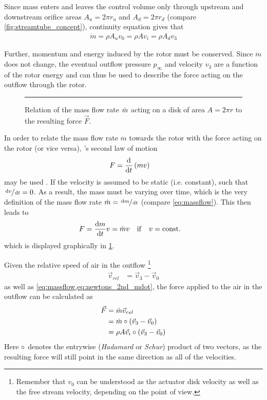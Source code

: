 Since mass enters and leaves the control volume only through upstream and downstream orifice areas $A_u = 2 \pi r_u$ and $A_d = 2 \pi r_d$ (compare \cref{fig:streamtube_concept}), continuity equation gives that 
%
\begin{align}
\dot{m} = \rho A_u v_0 = \rho A v_i = \rho A_d v_3 \label{eq:massflow_continuity}
\end{align}

Further, momentum and energy induced by the rotor must be conserved. 
Since $\dot{m}$ does not change, the eventual outflow pressure $p_\infty$ and velocity $v_3$ are a function of the rotor energy and can thus be used
to describe the force acting on the outflow through the rotor.

\begin{figure}
	\centering
	

	\rule{35em}{0.5pt}
	\caption[Mass flow rate and force]
			{Relation of the mass flow rate $\dot{m}$ acting on a disk of area $A = 2\pi r$ to the resulting force $\vec{F}$.}
	\label{fig:mass_flow_force}
\end{figure}

In order to relate the mass flow rate $\dot{m}$ towards the rotor with the force acting on the rotor (or vice versa), 's second law of motion
%
\begin{align}
F &= \frac{\mathop{}\!\mathrm{d}}{\mathop{}\!\mathrm{d} t} \left( m v \right) \label{eq:newtons_2nd}
\end{align}
%
may be used \cite{book:siekmann2008}.
If the velocity is assumed to be static (i.e. constant), such that $\sfrac{\mathop{}\!\mathrm{d} v}{\mathop{}\!\mathrm{d} t} = 0$. 
As a result, the mass must be varying over time, which is the very definition of the mass flow rate $\dot{m} = \sfrac{\mathop{}\!\mathrm{d} m}{\mathop{}\!\mathrm{d} t}$ (compare \cref{eq:massflow}). 
This then leads to
%
\begin{align}
F &= \frac{\mathop{}\!\mathrm{d} m}{\mathop{}\!\mathrm{d} t} v = \dot{m} v \quad \mathrm{if} \quad v = \mathrm{const.} \label{eq:newtons_2nd_mdot}
\end{align}
%
which is displayed graphically in \cref{fig:mass_flow_force}.

Given the relative speed of air in the outflow%
\footnote{Remember that $v_0$ can be understood as the actuator disk velocity as well as the free stream velocity, depending on the point of view.} 
%
\begin{align}
\vec{v}_{rel} &= \vec{v}_3 - \vec{v}_0
\end{align}
%
as well as \cref{eq:massflow,eq:newtons_2nd_mdot}, the force applied to the air in the outflow can be calculated \cite{durand1935} as
%
\begin{align}
\vec{F} &= \dot{m} \vec{v}_{rel} \notag \\
		&= \dot{m} \circ \left( \vec{v}_3 - \vec{v}_0 \right) \\
		&= \rho A \vec{v}_i \circ \left( \vec{v}_3 - \vec{v}_0 \right) \label{eq:thrust_mdot}
\end{align}
%
Here $\circ$ denotes the entrywise (\textit{Hadamard} or \textit{Schur}) product of two vectors, as the resulting force will still point in the same direction as all of the velocities.

